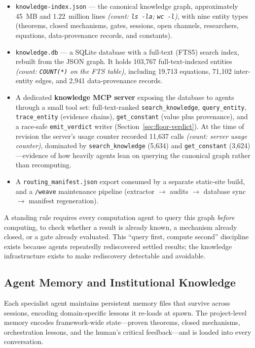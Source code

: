 \documentclass[12pt,a4paper]{article}
\newcommand{\countnote}[1]{{\small\textit{(count: #1)}}}
\begin{document}
\begin{itemize}
    \item \texttt{knowledge-index.json} --- the canonical knowledge graph, approximately 45~MB and 1.22~million lines \countnote{\texttt{ls -la}; \texttt{wc -l}}, with nine entity types (theorems, closed mechanisms, gates, sessions, open channels, researchers, equations, data-provenance records, and constants).
    \item \texttt{knowledge.db} --- a SQLite database with a full-text (FTS5) search index, rebuilt from the JSON graph. It holds 103{,}767 full-text-indexed entities \countnote{\texttt{COUNT(*)} on the FTS table}, including 19{,}713 equations, 71{,}102 inter-entity edges, and 2{,}941 data-provenance records.
    \item A dedicated \textbf{knowledge MCP server} exposing the database to agents through a small tool set: full-text-ranked \texttt{search\_knowledge}, \texttt{query\_entity}, \texttt{trace\_entity} (evidence chains), \texttt{get\_constant} (value plus provenance), and a race-safe \texttt{emit\_verdict} writer (Section~\ref{sec:floor-verdict}). At the time of revision the server's usage counter recorded 11{,}637 calls \countnote{server usage counter}, dominated by \texttt{search\_knowledge} (5{,}634) and \texttt{get\_constant} (3{,}624)---evidence of how heavily agents lean on querying the canonical graph rather than recomputing.
    \item A \texttt{routing\_manifest.json} export consumed by a separate static-site build, and a \texttt{/weave} maintenance pipeline (extractor $\to$ audits $\to$ database sync $\to$ manifest regeneration).
\end{itemize}

A standing rule requires every computation agent to query this graph \emph{before} computing, to check whether a result is already known, a mechanism already closed, or a gate already evaluated. This ``query first, compute second'' discipline exists because agents repeatedly rediscovered settled results; the knowledge infrastructure exists to make rediscovery detectable and avoidable.

\subsection{Agent Memory and Institutional Knowledge}
\label{sec:memory}

Each specialist agent maintains persistent memory files that survive across sessions, encoding domain-specific lessons it re-loads at spawn. The project-level memory encodes framework-wide state---proven theorems, closed mechanisms, orchestration lessons, and the human's critical feedback---and is loaded into every conversation.
\end{document}

